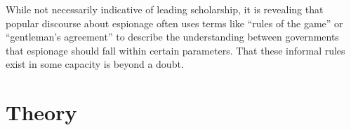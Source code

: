 \documentclass[14pt]{extarticle}
\begin{document}


While not necessarily indicative of leading scholarship, it is revealing that popular discourse about espionage often uses terms like \enquote{rules of the game} or \enquote{gentleman's agreement} to describe the understanding between governments that espionage should fall within certain parameters. That these informal rules exist in some capacity is beyond a doubt.





\section{Theory}


\end{document}
